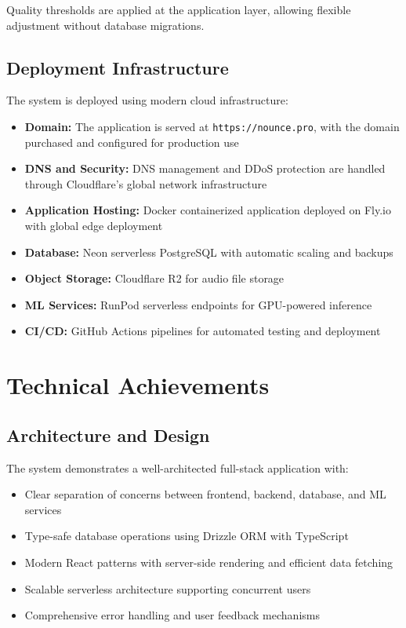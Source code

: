\documentclass[a4paper,12pt]{report}
\begin{document}
Quality thresholds are applied at the application layer, allowing flexible adjustment without database migrations.

\subsection{Deployment Infrastructure}

The system is deployed using modern cloud infrastructure:
\begin{itemize}
    \item \textbf{Domain:} The application is served at \texttt{https://nounce.pro}, with the domain purchased and configured for production use
    \item \textbf{DNS and Security:} DNS management and DDoS protection are handled through Cloudflare's global network infrastructure
    \item \textbf{Application Hosting:} Docker containerized application deployed on Fly.io with global edge deployment
    \item \textbf{Database:} Neon serverless PostgreSQL with automatic scaling and backups
    \item \textbf{Object Storage:} Cloudflare R2 for audio file storage
    \item \textbf{ML Services:} RunPod serverless endpoints for GPU-powered inference
    \item \textbf{CI/CD:} GitHub Actions pipelines for automated testing and deployment
\end{itemize}

\section{Technical Achievements}

\subsection{Architecture and Design}

The system demonstrates a well-architected full-stack application with:
\begin{itemize}
    \item Clear separation of concerns between frontend, backend, database, and ML services
    \item Type-safe database operations using Drizzle ORM with TypeScript
    \item Modern React patterns with server-side rendering and efficient data fetching
    \item Scalable serverless architecture supporting concurrent users
    \item Comprehensive error handling and user feedback mechanisms
\end{itemize}
\end{document}
